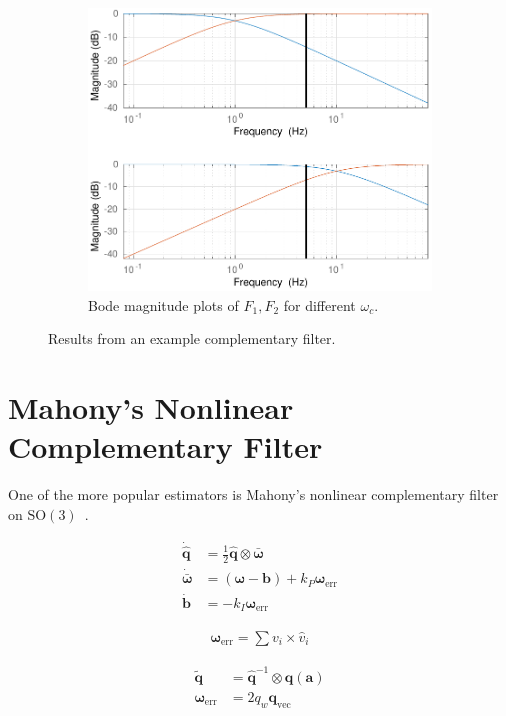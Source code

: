\documentclass[a4paper]{article}
\begin{document}
\begin{figure}[h]
\begin{subfigure}[t]{0.32\textwidth}
    \includegraphics[width=\textwidth]{scf_bode.pdf}
    \caption{Bode magnitude plots of $F_1, F_2$ for different $\omega_c$.}
  \end{subfigure}
  \caption{Results from an example complementary filter.}
  \label{fig:scf}
\end{figure}

\section*{Mahony's Nonlinear Complementary Filter}
One of the more popular estimators is Mahony's nonlinear complementary filter on $\mathrm{SO}(3)$~\cite{Mahony2008}.

\begin{align}
  \dot{\bm{\hat{q}}} &= \frac{1}{2} \hat{\bm q} \otimes \bm{\bar \omega} \\
  \dot{\bm{\bar \omega}} &= (\bm{\omega} - \bm{b}) + k_P\bm{\omega}_\text{err} \\
  \dot{\bm{b}} &= -k_I\bm{\omega}_\text{err}
\end{align}

\begin{align}
  \bm{\omega}_\text{err} = \sum v_i \times \hat{v}_i
\end{align}

\begin{align}
  \tilde{\bm{q}} &= \hat{\bm q}^{-1} \otimes \bm{q}(\bm{a}) \\
  \bm{\omega}_\text{err} &= 2 q_w \bm{q}_\text{vec}
\end{align}



\end{document}
